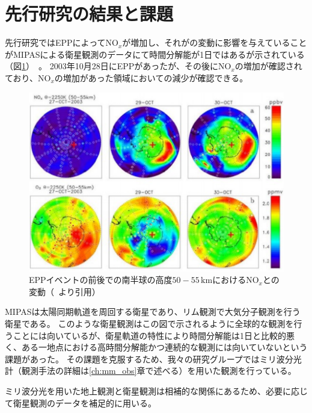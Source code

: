 \section{先行研究の結果と課題}
\label{sec:intro_privious}
先行研究ではEPPによって$\mathrm{NO}_x$が増加し、それがの変動に影響を与えていることがMIPASによる衛星観測のデータにて時間分解能が1日ではあるが示されている（図\ref{fig:lopez2005observation_fig3}）~\cite{lopez2005observation}。
2003年10月28日にEPPがあったが、その後に$\mathrm{NO}_x$の増加が確認されており、$\mathrm{NO}_x$の増加があった領域においての減少が確認できる。
\begin{figure}[htbp]
    \centering
    \includegraphics[width=\linewidth]{master_thesis_contents/master_thesis_fig/lopez2005observation_fig3.pdf}
    \caption{EPPイベントの前後での南半球の高度$50-55\, \mathrm{km}$における$\mathrm{NO}_x$との変動（~\cite{lopez2005observation}より引用）}
    \label{fig:lopez2005observation_fig3}
\end{figure}
MIPASは太陽同期軌道を周回する衛星であり、リム観測で大気分子観測を行う衛星である。
このような衛星観測はこの図で示されるように全球的な観測を行うことには向いているが、衛星軌道の特性により時間分解能は1日と比較的悪く、ある一地点における高時間分解能かつ連続的な観測には向いていないという課題があった。
その課題を克服するため、我々の研究グループではミリ波分光計（観測手法の詳細は\ref{ch:mm_obs}章で述べる）を用いた観測を行っている。\par
ミリ波分光を用いた地上観測と衛星観測は相補的な関係にあるため、必要に応じて衛星観測のデータを補足的に用いる。
